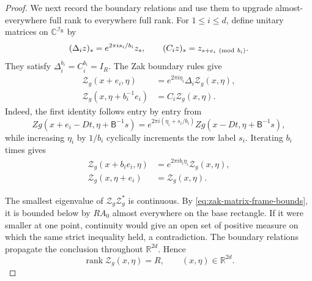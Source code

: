 \documentclass[11pt,reqno]{amsart}
\numberwithin{equation}{section}
\theoremstyle{definition}
\theoremstyle{remark}
\newcommand{\R}{\mathbb R}
\newcommand{\C}{\mathbb C}
\newcommand{\rank}{\operatorname{rank}}
\begin{document}
\begin{proof}
We next record the boundary relations and use them to upgrade almost-everywhere full rank to everywhere full rank.
For $1\le i\le d$, define unitary matrices on
$\C^{\mathcal I_{\mathsf B}}$ by
\begin{equation}\label{eq:zak-Delta-C}
 (\Delta_i z)_s=e^{2\pi i s_i/b_i}z_s,
 \qquad
 (C_i z)_s=z_{s+e_i\ ({\rm mod}\ b_i)}.
\end{equation}
They satisfy $\Delta_i^{b_i}=C_i^{b_i}=I_R$.  The Zak boundary rules give
\begin{align}
 \mathcal Z_g(x+e_i,\eta)
  &=e^{2\pi i\eta_i}\Delta_i\mathcal Z_g(x,\eta),
                                                        \label{eq:zak-fine-x}\\
 \mathcal Z_g(x,\eta+b_i^{-1}e_i)
  &=C_i\mathcal Z_g(x,\eta).                   \label{eq:zak-fine-eta}
\end{align}
Indeed, the first identity follows entry by entry from
\[
 Zg(x+e_i-Dt,\eta+\mathsf B^{-1}s)
 =e^{2\pi i(\eta_i+s_i/b_i)}
  Zg(x-Dt,\eta+\mathsf B^{-1}s),
\]
while increasing $\eta_i$ by $1/b_i$ cyclically increments the row label
$s_i$.  Iterating $b_i$ times gives
\begin{align}
 \mathcal Z_g(x+b_i e_i,\eta)
  &=e^{2\pi i b_i\eta_i}\mathcal Z_g(x,\eta),
                                                        \label{eq:zak-coarse-x}\\
 \mathcal Z_g(x,\eta+e_i)
  &=\mathcal Z_g(x,\eta).                       \label{eq:zak-coarse-eta}
\end{align}

The smallest eigenvalue of $\mathcal Z_g\mathcal Z_g^*$ is continuous.  By
\eqref{eq:zak-matrix-frame-bounds}, it is bounded below by $RA_0$ almost
everywhere on the base rectangle.  If it were smaller at one point,
continuity would give an open set of positive measure on which the same
strict inequality held, a contradiction.  The boundary relations propagate
the conclusion throughout $\R^{2d}$.  Hence
\begin{equation}\label{eq:zak-everywhere-rank}
                      \rank \mathcal Z_g(x,\eta)=R,
 \qquad (x,\eta)\in\R^{2d}.
\end{equation}


\end{proof}
\end{document}
